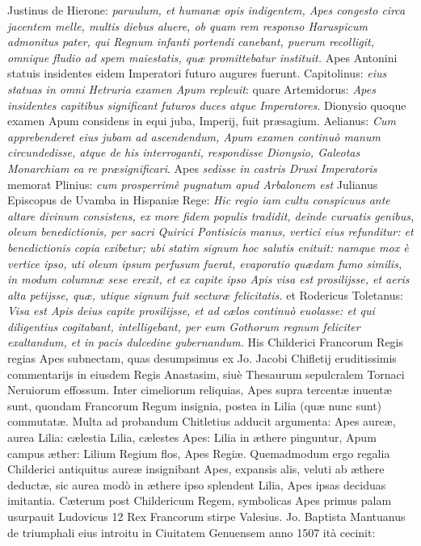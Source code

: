 \documentclass[a4paper, 11pt, oneside, polutonikogreek, latin]{article}
\begin{document}
Justinus de Hierone: \emph{paruulum, et humanæ opis indigentem, Apes congesto circa jacentem melle, multis diebus aluere, ob quam rem responso Haruspicum admonitus pater, qui Regnum infanti portendi canebant, puerum recolligit, omnique fludio ad spem maiestatis, quæ promittebatur instituit.} Apes Antonini statuis insidentes eidem Imperatori futuro augures fuerunt. Capitolinus: \emph{eius statuas in omni Hetruria examen Apum repleuit}: quare Artemidorus: \emph{Apes insidentes capitibus significant futuros duces atque Imperatores}. Dionysio quoque examen Apum considens in equi juba, Imperij, fuit præsagium. Aelianus: \emph{Cum apprebenderet eius jubam ad ascendendum, Apum examen continuò manum circundedisse, atque de his interroganti, respondisse Dionysio, Galeotas Monarchiam ea re præsignificari}. Apes \emph{sedisse in castris Drusi Imperatoris} memorat Plinius: \emph{cum prosperrimè pugnatum apud Arbalonem est} Julianus Episcopus de Uvamba in Hispaniæ Rege: \emph{Hic regio iam cultu conspicuus ante altare divinum consistens, ex more fidem populis tradidit, deinde curuatis genibus, oleum benedictionis, per sacri Quirici Pontisicis manus, vertici eius refunditur: et benedictionis copia exibetur; ubi statim signum hoc salutis enituit: namque mox è vertice ipso, uti oleum ipsum perfusum fuerat, evaporatio quædam fumo similis, in modum columnæ sese erexit, et ex capite ipso Apis visa est prosilijsse, et aeris alta petijsse, quæ, utique signum fuit secturæ felicitatis.} et Rodericus Toletanus: \emph{Visa est Apis deius capite prosilijsse, et ad cælos continuò euolasse: et qui diligentius cogitabant, intelligebant, per eum Gothorum regnum feliciter exaltandum, et in pacis dulcedine gubernandum.} His Childerici Francorum Regis regias Apes subnectam, quas desumpsimus ex Jo. Jacobi Chifletij eruditissimis commentarijs in eiusdem Regis Anastasim, siuè Thesaurum sepulcralem Tornaci Neruiorum effossum. Inter cimeliorum reliquias, Apes supra tercentæ inuentæ sunt, quondam Francorum Regum insignia, postea in Lilia (quæ nunc sunt) commutatæ. Multa ad probandum Chitletius adducit argumenta: Apes aureæ, aurea Lilia: cælestia Lilia, cælestes Apes: Lilia in æthere pinguntur, Apum campus æther: Lilium Regium flos, Apes Regiæ. Quemadmodum ergo regalia Childerici antiquitus aureæ insignibant Apes, expansis alis, veluti ab æthere deductæ, sic aurea modò in æthere ipso splendent Lilia, Apes ipsas deciduas imitantia. Cæterum post Childericum Regem, symbolicas Apes primus palam usurpauit Ludovicus 12 Rex Francorum stirpe Valesius. Jo. Baptista Mantuanus de triumphali eius introitu in Ciuitatem Genuensem anno 1507 ità cecinit:
\end{document}

